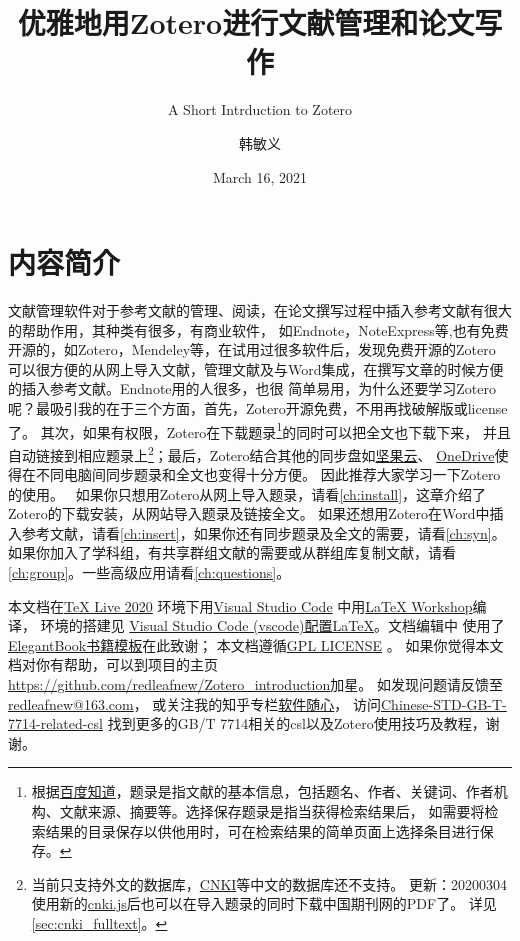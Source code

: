 \documentclass[cn,11pt,chinese]{elegantbook}
\title{优雅地用Zotero进行文献管理和论文写作}
\subtitle{A Short Intrduction to Zotero}
\author{韩敏义}
\institute{南京农业大学\\\kaishu\hspace{1.1cm}温氏食品集团股份有限公司}
\date{March 16, 2021}
\begin{document}
 
\maketitle
\frontmatter

  \chapter*{内容简介}
	
		文献管理软件对于参考文献的管理、阅读，在论文撰写过程中插入参考文献有很大的帮助作用，其种类有很多，有商业软件，
		如Endnote，NoteExpress等,也有免费开源的，如Zotero，Mendeley等，在试用过很多软件后，发现免费开源的Zotero
		可以很方便的从网上导入文献，管理文献及与Word集成，在撰写文章的时候方便的插入参考文献。Endnote用的人很多，也很
		简单易用，为什么还要学习Zotero呢？最吸引我的在于三个方面，首先，Zotero开源免费，不用再找破解版或license了。
		其次，如果有权限，Zotero在下载题录\footnote{根据\href{https://zhidao.baidu.com/question/443193991.html}
		{百度知道}，题录是指文献的基本信息，包括题名、作者、关键词、作者机构、文献来源、摘要等。选择保存题录是指当获得检索结果后，
		如需要将检索结果的目录保存以供他用时，可在检索结果的简单页面上选择条目进行保存。}的同时可以把全文也下载下来，
		并且自动链接到相应题录上\footnote{当前只支持外文的数据库，\href{http://www.cnki.net}{CNKI}等中文的数据库还不支持。
		更新：20200304 使用新的\href{https://github.com/Zotero-CN/translators_CN}{cnki.js}后也可以在导入题录的同时下载中国期刊网的PDF了。
		详见\cref{sec:cnki_fulltext}。}；最后，Zotero结合其他的同步盘如\href{https://www.jianguoyun.com}{坚果云}、
		\href{https://office.live.com/start/OneDrive.aspx}{OneDrive}使得在不同电脑间同步题录和全文也变得十分方便。
		因此推荐大家学习一下Zotero的使用。
		\
		如果你只想用Zotero从网上导入题录，请看\cref{ch:install}，这章介绍了Zotero的下载安装，从网站导入题录及链接全文。
		如果还想用Zotero在Word中插入参考文献，请看\cref{ch:insert}，如果你还有同步题录及全文的需要，请看\cref{ch:syn}。
		如果你加入了学科组，有共享群组文献的需要或从群组库复制文献，请看\cref{ch:group}。一些高级应用请看\cref{ch:questions}。
		
		
		本文档在\href{http://tug.org/texlive/}{\TeX{} Live 2020} 环境下用\href{https://code.visualstudio.com/}{Visual Studio Code}
		中用\href{https://marketplace.visualstudio.com/items?itemName=James-Yu.latex-workshop}{LaTeX Workshop}编译，
		环境的搭建见
		\href{https://zhuanlan.zhihu.com/p/166523064}{Visual Studio Code (vscode)配置LaTeX}。文档编辑中
		使用了\href{https://elegantlatex.org/}{ElegantBook书籍模板}在此致谢；
		本文档遵循\href{https://www.gnu.org/licenses/gpl-3.0.txt}{GPL LICENSE} 。
		如果你觉得本文档对你有帮助，可以到项目的主页
		\url{https://github.com/redleafnew/Zotero_introduction}加星。
		如发现问题请反馈至\href{mailto:redleafnew@163.com}{redleafnew@163.com}，
		或关注我的知乎专栏\href{https://zhuanlan.zhihu.com/c_1071081428967743488}{软件随心}，
		访问\href{https://github.com/redleafnew/Chinese-std-GB-T-7714-related-csl}
		{Chinese-STD-GB-T-7714-related-csl}
		找到更多的GB/T 7714相关的csl以及Zotero使用技巧及教程，谢谢。
\end{document}
